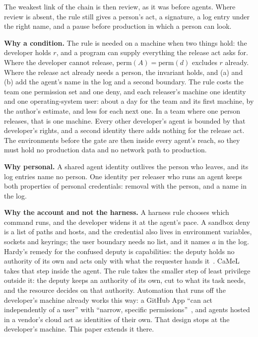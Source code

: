 \documentclass[11pt]{article}
\theoremstyle{definition}
\begin{document}
The weakest link of the chain is then review, as it was before agents. Where review is absent, the rule still gives a person's act, a signature, a log entry under the right name, and a pause before production in which a person can look.

\textbf{Why a condition.} The rule is needed on a machine when two things hold: the developer holds $r$, and a program can supply everything the release act asks for. Where the developer cannot release, $\mathrm{perm}(A) = \mathrm{perm}(d)$ excludes $r$ already. Where the release act already needs a person, the invariant holds, and (a) and (b) add the agent's name in the log and a second boundary. The rule costs the team one permission set and one deny, and each releaser's machine one identity and one operating-system user: about a day for the team and its first machine, by the author's estimate, and less for each next one. In a team where one person releases, that is one machine. Every other developer's agent is bounded by that developer's rights, and a second identity there adds nothing for the release act. The environments before the gate are then inside every agent's reach, so they must hold no production data and no network path to production.

\textbf{Why personal.} A shared agent identity outlives the person who leaves, and its log entries name no person. One identity per releaser who runs an agent keeps both properties of personal credentials: removal with the person, and a name in the log.

\textbf{Why the account and not the harness.} A harness rule chooses which command runs, and the developer widens it at the agent's pace. A sandbox deny is a list of paths and hosts, and the credential also lives in environment variables, sockets and keyrings; the user boundary needs no list, and it names $a$ in the log. Hardy's remedy for the confused deputy is capabilities: the deputy holds no authority of its own and acts only with what the requester hands it~\cite{Hardy}. CaMeL takes that step inside the agent. The rule takes the smaller step of least privilege outside it: the deputy keeps an authority of its own, cut to what its task needs, and the resource decides on that authority. Automation that runs off the developer's machine already works this way: a GitHub App ``can act independently of a user'' with ``narrow, specific permissions''~\cite{GitHubApps}, and agents hosted in a vendor's cloud act as identities of their own. That design stops at the developer's machine. This paper extends it there.
\end{document}
